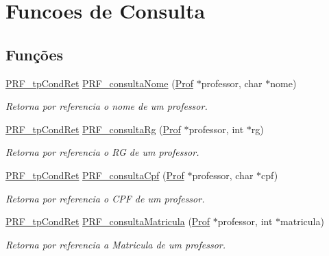 \hypertarget{group__funcoes_consulta}{}\section{Funcoes de Consulta}
\label{group__funcoes_consulta}
\subsection*{Funções}
\begin{DoxyCompactItemize}
\item 
\hyperlink{group__modulo_professor_ga777e215896d573d2e99d98793b1f0ed1}{P\+R\+F\+\_\+tp\+Cond\+Ret} \hyperlink{group__funcoes_consulta_ga30908e7603542d06c05f14208498fd3d}{P\+R\+F\+\_\+consulta\+Nome} (\hyperlink{structprof}{Prof} $\ast$professor, char $\ast$nome)
\begin{DoxyCompactList}\small\item\em Retorna por referencia o nome de um professor. \end{DoxyCompactList}\item 
\hyperlink{group__modulo_professor_ga777e215896d573d2e99d98793b1f0ed1}{P\+R\+F\+\_\+tp\+Cond\+Ret} \hyperlink{group__funcoes_consulta_ga231f378246f5583fb7e16c0f54958af8}{P\+R\+F\+\_\+consulta\+Rg} (\hyperlink{structprof}{Prof} $\ast$professor, int $\ast$rg)
\begin{DoxyCompactList}\small\item\em Retorna por referencia o RG de um professor. \end{DoxyCompactList}\item 
\hyperlink{group__modulo_professor_ga777e215896d573d2e99d98793b1f0ed1}{P\+R\+F\+\_\+tp\+Cond\+Ret} \hyperlink{group__funcoes_consulta_gae9e9268cbc4aad856eae4d5dbb322bc1}{P\+R\+F\+\_\+consulta\+Cpf} (\hyperlink{structprof}{Prof} $\ast$professor, char $\ast$cpf)
\begin{DoxyCompactList}\small\item\em Retorna por referencia o C\+PF de um professor. \end{DoxyCompactList}\item 
\hyperlink{group__modulo_professor_ga777e215896d573d2e99d98793b1f0ed1}{P\+R\+F\+\_\+tp\+Cond\+Ret} \hyperlink{group__funcoes_consulta_ga099afc8cbe22cd9570eda47c5d385296}{P\+R\+F\+\_\+consulta\+Matricula} (\hyperlink{structprof}{Prof} $\ast$professor, int $\ast$matricula)
\begin{DoxyCompactList}\small\item\em Retorna por referencia a Matricula de um professor. \end{DoxyCompactList}\item 

\end{DoxyCompactItemize}

